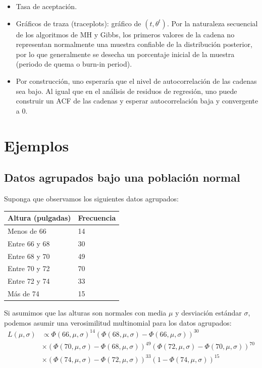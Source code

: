\documentclass[
  12pt,
]{book}
\providecommand{\tightlist}{%
  \setlength{\itemsep}{0pt}\setlength{\parskip}{0pt}}
\theoremstyle{definition}
\theoremstyle{definition}
\theoremstyle{definition}
\theoremstyle{definition}
\theoremstyle{remark}
\begin{document}
\begin{itemize}
\tightlist
\item
  Tasa de aceptación.
\item
  Gráficos de traza (traceplots): gráfico de \((t,\theta^t)\). Por la naturaleza secuencial de los algoritmos de MH y Gibbs, los primeros valores de la cadena no representan normalmente una muestra confiable de la distribución posterior, por lo que generalmente se desecha un porcentaje inicial de la muestra (periodo de quema o burn-in period).
\item
  Por construcción, uno esperaría que el nivel de autocorrelación de las cadenas sea bajo. Al igual que en el análisis de residuos de regresión, uno puede construir un ACF de las cadenas y esperar autocorrelación baja y convergente a 0.
\end{itemize}

\hypertarget{ejemplos}{%
\section{Ejemplos}\label{ejemplos}}

\hypertarget{datos-agrupados-bajo-una-poblaciuxf3n-normal}{%
\subsection{Datos agrupados bajo una población normal}\label{datos-agrupados-bajo-una-poblaciuxf3n-normal}}

Suponga que observamos los siguientes datos agrupados:

\begin{longtable}[]{@{}ll@{}}
\toprule()
Altura (pulgadas) & Frecuencia \\
\midrule()
\endhead
Menos de 66 & 14 \\
Entre 66 y 68 & 30 \\
Entre 68 y 70 & 49 \\
Entre 70 y 72 & 70 \\
Entre 72 y 74 & 33 \\
Más de 74 & 15 \\
\bottomrule()
\end{longtable}

Si asumimos que las alturas son normales con media \(\mu\) y desviación estándar \(\sigma\), podemos asumir una verosimilitud multinomial para los datos agrupados:
\begin{align*}
L(\mu,\sigma)&\propto \Phi(66,\mu,\sigma)^{14}(\Phi(68,\mu,\sigma)-\Phi(66,\mu,\sigma))^{30} \\
&\times  (\Phi(70,\mu,\sigma)-\Phi(68,\mu,\sigma))^{49} (\Phi(72,\mu,\sigma)-\Phi(70,\mu,\sigma))^{70}\\
&\times  (\Phi(74,\mu,\sigma)-\Phi(72,\mu,\sigma))^{33} (1-\Phi(74,\mu,\sigma))^{15}
\end{align*}
\end{document}
